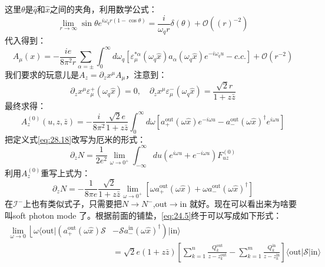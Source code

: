 这里$\theta$是$\hat q$和$\hat x$之间的夹角，利用数学公式：
\begin{equation}
	\lim_{r\to\infty}\sin\theta e^{i\omega_qr(1-\cos\theta)}=\frac{i}{\omega_qr}\delta(\theta)+\mathcal{O}((r)^{-2})
\end{equation}
代入得到：
\begin{equation}
	A_\mu(x)=-\frac{ie}{8\pi^{2}r}\sum_{\alpha=\pm}\int_{0}^{\infty}d\omega_{q}\left[\varepsilon_{\mu}^{*\alpha}(\omega_{q}\hat{x})a_{\alpha}(\omega_{q}\hat{x})e^{-i\omega_{q}u}-c.c.\right]+\mathcal{O}(r^{-2})
\end{equation}
我们要求的玩意儿是$A_{z}=\partial_{z}x^{\mu}A_{\mu}$，注意到：
\[
	\partial_{z}x^{\mu}\varepsilon_{\mu}^{+}(\omega_{q}\hat{x})=0,\quad\partial_{z}x^{\mu}\varepsilon_{\mu}^{-}(\omega_{q}\hat{x})=\frac{\sqrt{2}r}{1+z\bar{z}}
\]
最终求得：
\begin{equation}
	A_{z}^{(0)}(u,z,\bar{z})=-\frac{i}{8\pi^2}\frac{\sqrt{2}e}{1+z\bar{z}}\int_{0}^{\infty}d\omega\left[a_{+}^{\mathrm{out}}(\omega\hat{x})e^{-i\omega u}-a_{-}^{\mathrm{out}}(\omega\hat{x})^\dagger e^{i\omega u}\right]
\end{equation}
把定义式\ref{eq:28.18}改写为厄米的形式：
\begin{equation}
	\partial_zN=\dfrac{1}{2e^2}\lim_{\omega\to0^+}\int_{-\infty}^{\infty}du\left(e^{i\omega u}+e^{-i\omega u}\right)F_{uz}^{(0)}
\end{equation}
利用$A_z^{(0)}$重写上式为：
\begin{equation}
	\partial_zN=-\frac{1}{8\pi e}\frac{\sqrt{2}}{1+z\bar{z}}\lim_{\omega\to0^+}\left[\omega a_+^{\mathrm{out}}(\omega\hat{x})+\omega a_-^{\mathrm{out}}(\omega\hat{x})^\dagger\right]
\end{equation}
在$\mathcal{I}^-$上也有类似式子，只需要把$N\to N^-$,out$\to$in 就好。现在可以看出来为啥要叫soft photon mode 了。根据前面的铺垫，\ref{eq:24.5}终于可以写成如下形式：
\begin{equation}
	\begin{aligned}
		\operatorname*{lim}_{\omega\rightarrow0}\left\lfloor\omega\langle\mathrm{out}|\left(a_{+}^{\mathrm{out}}(\omega\hat{x})\mathcal{S}\right.\right.& \left.-\mathcal{S}a_{-}^{\mathrm{in}}(\omega\hat{x})^{\dagger}\right)|\mathrm{in}\rangle   \\
		&=\sqrt{2}e(1+z\bar{z})\left[\sum_{k=1}^{n}\frac{Q_{k}^\mathrm{out}}{z-z_{k}^\mathrm{out}}-\sum_{k=1}^{m}\frac{Q_{k}^\mathrm{in}}{z-z_{k}^\mathrm{in}}\right]\langle\mathrm{out}|\mathcal{S}|\mathrm{in}\rangle 
	\end{aligned}
\end{equation}
